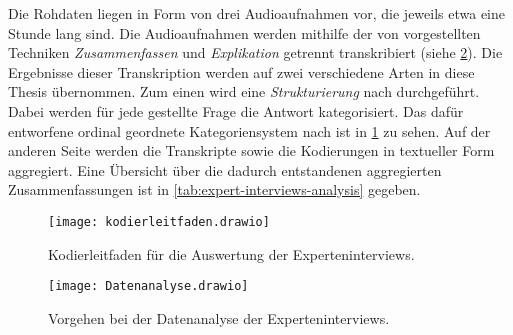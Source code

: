 Die Rohdaten liegen in Form von drei Audioaufnahmen vor, die jeweils etwa eine Stunde lang sind.
Die Audioaufnahmen werden mithilfe der von  vorgestellten Techniken  \emph{Zusammenfassen} und \emph{Explikation} getrennt transkribiert (siehe \cref{fig:datenanalyse}).
Die Ergebnisse dieser Transkription werden auf zwei verschiedene Arten in diese Thesis übernommen.
Zum einen wird eine \emph{Strukturierung} nach  durchgeführt.
Dabei werden für jede gestellte Frage die Antwort kategorisiert.
Das dafür entworfene \glqq ordinal geordnete Kategoriensystem\grqq{} nach  ist in \cref{fig:kodierleitfaden} zu sehen.
Auf der anderen Seite werden die Transkripte sowie die Kodierungen in textueller Form aggregiert.
Eine Übersicht über die dadurch entstandenen aggregierten Zusammenfassungen ist in \cref{tab:expert-interviews-analysis} gegeben.

\begin{figure}[!ht]
	\centering
	\texttt{[image: kodierleitfaden.drawio]}
	\caption[Kodierleitfaden Auswertung Experteninterviews]{
		Kodierleitfaden für die Auswertung der Experteninterviews.
	}
	\label{fig:kodierleitfaden}
\end{figure}

\begin{figure}[!h]
	\centering
	\texttt{[image: Datenanalyse.drawio]}
	\caption[Vorgehen Datenanalyse Experteninterviews]{
		Vorgehen bei der Datenanalyse der Experteninterviews.
	}
	\label{fig:datenanalyse}
\end{figure}






